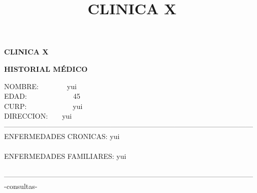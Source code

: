 \documentclass[10pt,a4paper]{letter}
\title{\bf CLINICA X}
\begin{document}
\begin{center}
{\scshape\LARGE \bf CLINICA X\par}
{\bf HISTORIAL MÉDICO\\}
\end{center}
NOMBRE:\ \ \ \ \ \ \ \ yui\\
EDAD:\ \ \ \ \ \ \ \ \ \ \ \ \ 45\\
CURP:\ \ \ \ \ \ \ \ \ \ \ \ \ yui \\
DIRECCION:\ \ \ \ yui\\
--------------------------------------------------------------------------------------------------------- \\
ENFERMEDADES CRONICAS: yui\\ \\
ENFERMEDADES FAMILIARES: yui \\ \\
--------------------------------------------------------------------------------------------------------- \\-consultas-
\end{document}
